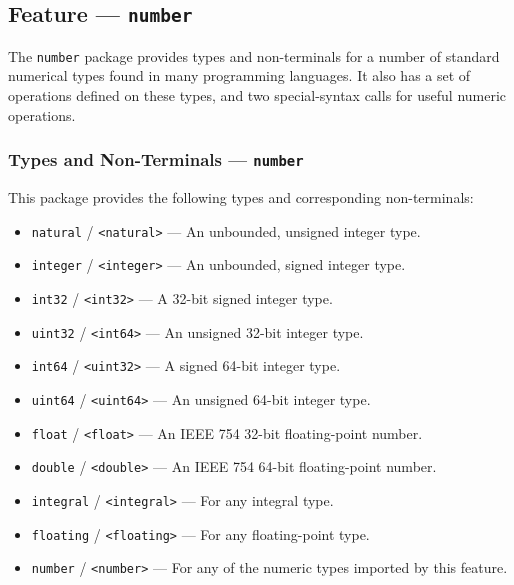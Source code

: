 
\subsection{Feature --- \texttt{number}} %
\label{sub:feature_number}
The \texttt{number} package provides types and non-terminals for a number of standard numerical types found in many programming languages.
It also has a set of operations defined on these types, and two special-syntax calls for useful numeric operations.

\subsubsection{Types and Non-Terminals --- \texttt{number}} %
\label{ssub:types_number}
This package provides the following types and corresponding non-terminals:
\begin{itemize}
    \item \texttt{natural} / \texttt{<natural>} --- An unbounded, unsigned integer type.
    \item \texttt{integer} / \texttt{<integer>} --- An unbounded, signed integer type.
    \item \texttt{int32} / \texttt{<int32>} --- A 32-bit signed integer type.
    \item \texttt{uint32} / \texttt{<int64>} --- An unsigned 32-bit integer type.
    \item \texttt{int64} / \texttt{<uint32>} --- A signed 64-bit integer type.
    \item \texttt{uint64} / \texttt{<uint64>} --- An unsigned 64-bit integer type.
    \item \texttt{float} / \texttt{<float>} --- An IEEE 754 32-bit floating-point number.
    \item \texttt{double} / \texttt{<double>} --- An IEEE 754 64-bit floating-point number.
    \item \texttt{integral} / \texttt{<integral>} --- For any integral type.
    \item \texttt{floating} / \texttt{<floating>} --- For any floating-point type.
    \item \texttt{number} / \texttt{<number>} --- For any of the numeric types imported by this feature.
\end{itemize}


